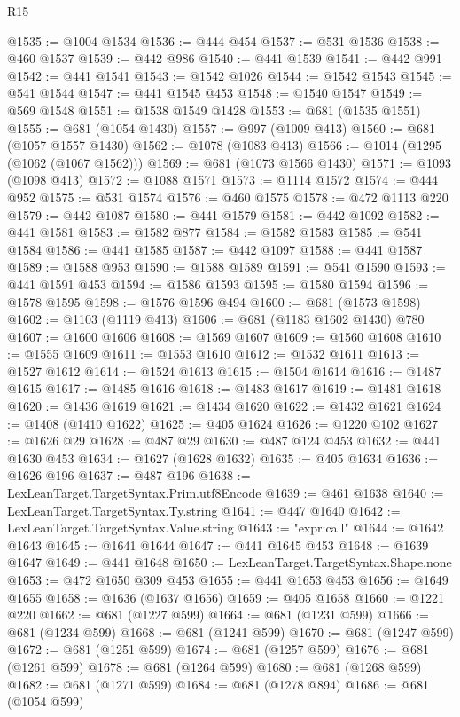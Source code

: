 \begin{lexlean}{R15}
\begin{coremodule}
@1535 := @1004 @1534
@1536 := @444 @454
@1537 := @531 @1536
@1538 := @460 @1537
@1539 := @442 @986
@1540 := @441 @1539
@1541 := @442 @991
@1542 := @441 @1541
@1543 := @1542 @1026
@1544 := @1542 @1543
@1545 := @541 @1544
@1547 := @441 @1545 @453
@1548 := @1540 @1547
@1549 := @569 @1548
@1551 := @1538 @1549 @1428
@1553 := @681 (@1535 @1551)
@1555 := @681 (@1054 @1430)
@1557 := @997 (@1009 @413)
@1560 := @681 (@1057 @1557 @1430)
@1562 := @1078 (@1083 @413)
@1566 := @1014 (@1295 (@1062 (@1067 @1562)))
@1569 := @681 (@1073 @1566 @1430)
@1571 := @1093 (@1098 @413)
@1572 := @1088 @1571
@1573 := @1114 @1572
@1574 := @444 @952
@1575 := @531 @1574
@1576 := @460 @1575
@1578 := @472 @1113 @220
@1579 := @442 @1087
@1580 := @441 @1579
@1581 := @442 @1092
@1582 := @441 @1581
@1583 := @1582 @877
@1584 := @1582 @1583
@1585 := @541 @1584
@1586 := @441 @1585
@1587 := @442 @1097
@1588 := @441 @1587
@1589 := @1588 @953
@1590 := @1588 @1589
@1591 := @541 @1590
@1593 := @441 @1591 @453
@1594 := @1586 @1593
@1595 := @1580 @1594
@1596 := @1578 @1595
@1598 := @1576 @1596 @494
@1600 := @681 (@1573 @1598)
@1602 := @1103 (@1119 @413)
@1606 := @681 (@1183 @1602 @1430) @780
@1607 := @1600 @1606
@1608 := @1569 @1607
@1609 := @1560 @1608
@1610 := @1555 @1609
@1611 := @1553 @1610
@1612 := @1532 @1611
@1613 := @1527 @1612
@1614 := @1524 @1613
@1615 := @1504 @1614
@1616 := @1487 @1615
@1617 := @1485 @1616
@1618 := @1483 @1617
@1619 := @1481 @1618
@1620 := @1436 @1619
@1621 := @1434 @1620
@1622 := @1432 @1621
@1624 := @1408 (@1410 @1622)
@1625 := @405 @1624
@1626 := @1220 @102
@1627 := @1626 @29
@1628 := @487 @29
@1630 := @487 @124 @453
@1632 := @441 @1630 @453
@1634 := @1627 (@1628 @1632)
@1635 := @405 @1634
@1636 := @1626 @196
@1637 := @487 @196
@1638 := LexLeanTarget.TargetSyntax.Prim.utf8Encode
@1639 := @461 @1638
@1640 := LexLeanTarget.TargetSyntax.Ty.string
@1641 := @447 @1640
@1642 := LexLeanTarget.TargetSyntax.Value.string
@1643 := "expr:call"
@1644 := @1642 @1643
@1645 := @1641 @1644
@1647 := @441 @1645 @453
@1648 := @1639 @1647
@1649 := @441 @1648
@1650 := LexLeanTarget.TargetSyntax.Shape.none
@1653 := @472 @1650 @309 @453
@1655 := @441 @1653 @453
@1656 := @1649 @1655
@1658 := @1636 (@1637 @1656)
@1659 := @405 @1658
@1660 := @1221 @220
@1662 := @681 (@1227 @599)
@1664 := @681 (@1231 @599)
@1666 := @681 (@1234 @599)
@1668 := @681 (@1241 @599)
@1670 := @681 (@1247 @599)
@1672 := @681 (@1251 @599)
@1674 := @681 (@1257 @599)
@1676 := @681 (@1261 @599)
@1678 := @681 (@1264 @599)
@1680 := @681 (@1268 @599)
@1682 := @681 (@1271 @599)
@1684 := @681 (@1278 @894)
@1686 := @681 (@1054 @599)

\end{coremodule}
\end{lexlean}
